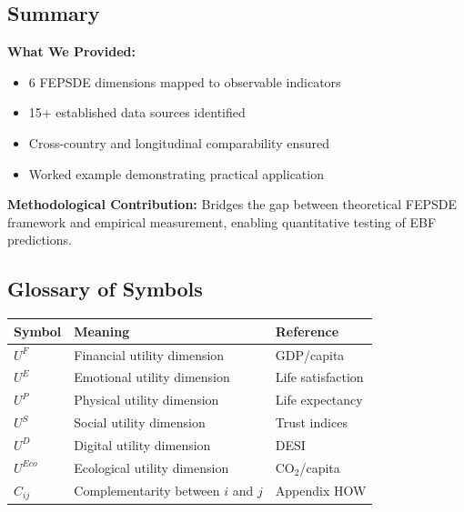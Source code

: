 

\subsection{Summary}
\label{sec:E-summary}

\begin{tcolorbox}[colback=blue!5!white, colframe=blue!75!black,
    title=\textbf{Summary: Operationalization}]

\textbf{What We Provided:}
\begin{itemize}[nosep]
    \item 6 FEPSDE dimensions mapped to observable indicators
    \item 15+ established data sources identified
    \item Cross-country and longitudinal comparability ensured
    \item Worked example demonstrating practical application
\end{itemize}

\textbf{Methodological Contribution:}
Bridges the gap between theoretical FEPSDE framework and empirical measurement,
enabling quantitative testing of EBF predictions.

\end{tcolorbox}


\subsection{Glossary of Symbols}
\label{sec:E-glossary}

\begin{center}
\begin{tabular}{@{}lll@{}}
\toprule
\textbf{Symbol} & \textbf{Meaning} & \textbf{Reference} \\
\midrule
$U^F$ & Financial utility dimension & GDP/capita \\
$U^E$ & Emotional utility dimension & Life satisfaction \\
$U^P$ & Physical utility dimension & Life expectancy \\
$U^S$ & Social utility dimension & Trust indices \\
$U^D$ & Digital utility dimension & DESI \\
$U^{Eco}$ & Ecological utility dimension & CO$_2$/capita \\
$C_{ij}$ & Complementarity between $i$ and $j$ & Appendix HOW \\
\bottomrule
\end{tabular}
\end{center}

